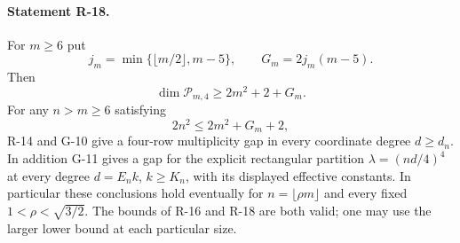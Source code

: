 \documentclass[11pt,a4paper]{article}
\theoremstyle{definition}\newtheorem{definition}{Definition}
\begin{document}
\paragraph{Statement R-18.}
For $m\geq6$ put
\[
 j_m=\min\{\lfloor m/2\rfloor,m-5\},\qquad
 G_m=2j_m(m-5).
\]
Then
\begin{equation}\label{R18:dimension}
 \dim\mathcal P_{m,4}\geq2m^2+2+G_m.
\end{equation}
For any $n>m\geq6$ satisfying
\begin{equation}\label{R18:padding}
 2n^2\leq2m^2+G_m+2,
\end{equation}
R-14 and G-10 give a four-row multiplicity gap in every
coordinate degree $d\geq d_n$. In addition G-11 gives a
gap for the explicit rectangular partition
$\lambda=(nd/4)^4$ at every degree
$d=E_n k$, $k\geq K_n$, with its displayed effective
constants. In particular these conclusions hold eventually
for $n=\lfloor\rho m\rfloor$ and every fixed
$1<\rho<\sqrt{3/2}$.
The bounds of R-16 and R-18 are both valid; one may use the
larger lower bound at each particular size.
\end{document}
